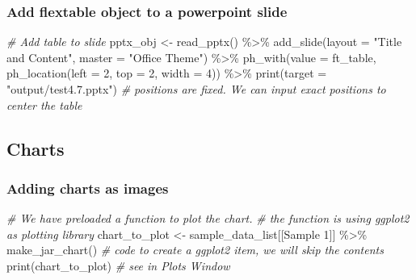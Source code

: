 \documentclass[
]{book}
\newenvironment{Shaded}{\begin{snugshade}}{\end{snugshade}}
\newcommand{\AttributeTok}[1]{\textcolor[rgb]{0.77,0.63,0.00}{#1}}
\newcommand{\CommentTok}[1]{\textcolor[rgb]{0.56,0.35,0.01}{\textit{#1}}}
\newcommand{\DecValTok}[1]{\textcolor[rgb]{0.00,0.00,0.81}{#1}}
\newcommand{\FunctionTok}[1]{\textcolor[rgb]{0.00,0.00,0.00}{#1}}
\newcommand{\NormalTok}[1]{#1}
\newcommand{\OtherTok}[1]{\textcolor[rgb]{0.56,0.35,0.01}{#1}}
\newcommand{\SpecialCharTok}[1]{\textcolor[rgb]{0.00,0.00,0.00}{#1}}
\newcommand{\StringTok}[1]{\textcolor[rgb]{0.31,0.60,0.02}{#1}}
\begin{document}
\hypertarget{add-flextable-object-to-a-powerpoint-slide}{%
\subsubsection{Add flextable object to a powerpoint slide}\label{add-flextable-object-to-a-powerpoint-slide}}

\begin{Shaded}
\begin{Highlighting}[]
\CommentTok{\# Add table to slide}
\NormalTok{pptx\_obj }\OtherTok{\textless{}{-}} \FunctionTok{read\_pptx}\NormalTok{() }\SpecialCharTok{\%\textgreater{}\%}
  \FunctionTok{add\_slide}\NormalTok{(}\AttributeTok{layout =} \StringTok{"Title and Content"}\NormalTok{, }\AttributeTok{master =} \StringTok{"Office Theme"}\NormalTok{) }\SpecialCharTok{\%\textgreater{}\%}
  \FunctionTok{ph\_with}\NormalTok{(}\AttributeTok{value =}\NormalTok{ ft\_table, }\FunctionTok{ph\_location}\NormalTok{(}\AttributeTok{left =} \DecValTok{2}\NormalTok{, }\AttributeTok{top =} \DecValTok{2}\NormalTok{, }\AttributeTok{width =} \DecValTok{4}\NormalTok{)) }\SpecialCharTok{\%\textgreater{}\%} 
  \FunctionTok{print}\NormalTok{(}\AttributeTok{target =} \StringTok{"output/test4.7.pptx"}\NormalTok{) }
\CommentTok{\# positions are fixed. We can input exact positions to center the table}
\end{Highlighting}
\end{Shaded}

\hypertarget{charts}{%
\subsection{Charts}\label{charts}}

\hypertarget{adding-charts-as-images}{%
\subsubsection{Adding charts as images}\label{adding-charts-as-images}}

\begin{Shaded}
\begin{Highlighting}[]
\CommentTok{\# We have preloaded a function to plot the chart.}
\CommentTok{\# the function is using ggplot2 as plotting library}
\NormalTok{chart\_to\_plot }\OtherTok{\textless{}{-}}\NormalTok{ sample\_data\_list[[}\StringTok{\textquotesingle{}Sample 1\textquotesingle{}}\NormalTok{]] }\SpecialCharTok{\%\textgreater{}\%}
  \FunctionTok{make\_jar\_chart}\NormalTok{() }\CommentTok{\# code to create a ggplot2 item, we will skip the contents}
\FunctionTok{print}\NormalTok{(chart\_to\_plot) }\CommentTok{\# see in Plots Window}
\end{Highlighting}
\end{Shaded}
\end{document}
